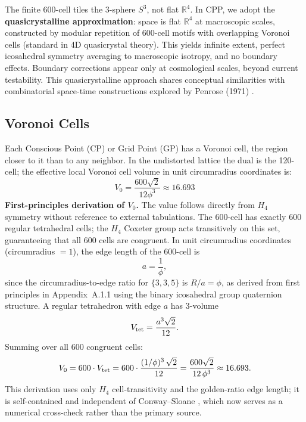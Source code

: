 \documentclass[11pt,letterpaper]{article}
\begin{document}
The finite 600-cell tiles the 3-sphere $S^3$, not flat $\mathbb{R}^4$. In CPP, we adopt the \textbf{quasicrystalline approximation}: space is flat $\mathbb{R}^4$ at macroscopic scales, constructed by modular repetition of 600-cell motifs with overlapping Voronoi cells (standard in 4D quasicrystal theory). This yields infinite extent, perfect icosahedral symmetry averaging to macroscopic isotropy, and no boundary effects. Boundary corrections appear only at cosmological scales, beyond current testability. This quasicrystalline approach shares conceptual similarities with combinatorial space-time constructions explored by Penrose (1971) \cite{penrose1971}.

\subsection{Voronoi Cells}

Each Conscious Point (CP) or Grid Point (GP) has a Voronoi cell, the region closer to it than to any neighbor. In the undistorted lattice the dual is the 120-cell; the effective local Voronoi cell volume in unit circumradius coordinates is:
\begin{equation}
V_0 = \frac{600\sqrt{2}}{12\phi^3} \approx 16.693
\label{eq:v0}
\end{equation}
\textbf{First-principles derivation of $V_0$.}
The value follows directly from $H_4$ symmetry without reference to 
external tabulations.
The 600-cell has exactly 600 regular tetrahedral cells; the $H_4$ 
Coxeter group acts transitively on this set, guaranteeing that all 
600 cells are congruent.
In unit circumradius coordinates (circumradius $= 1$), the edge length of the 600-cell is
\begin{equation}
  a = \frac{1}{\phi},
  \label{eq:edge_length_ref}
\end{equation}
since the circumradius-to-edge ratio for $\{3,3,5\}$ is $R/a = \phi$, 
as derived from first principles in Appendix~A.1.1 using the binary 
icosahedral group quaternion structure.
A regular tetrahedron with edge $a$ has 3-volume
\[
  V_{\rm tet} = \frac{a^3\sqrt{2}}{12}.
\]
Summing over all 600 congruent cells:
\begin{equation}
  V_0 = 600 \cdot V_{\rm tet}
      = 600 \cdot \frac{(1/\phi)^3\,\sqrt{2}}{12}
      = \frac{600\sqrt{2}}{12\,\phi^3}
      \approx 16.693.
  \label{eq:v0_derived}
\end{equation}
This derivation uses only $H_4$ cell-transitivity and the 
golden-ratio edge length; it is self-contained and independent of 
Conway--Sloane \cite{conway1988}, which now serves as a numerical 
cross-check rather than the primary source.
\end{document}
